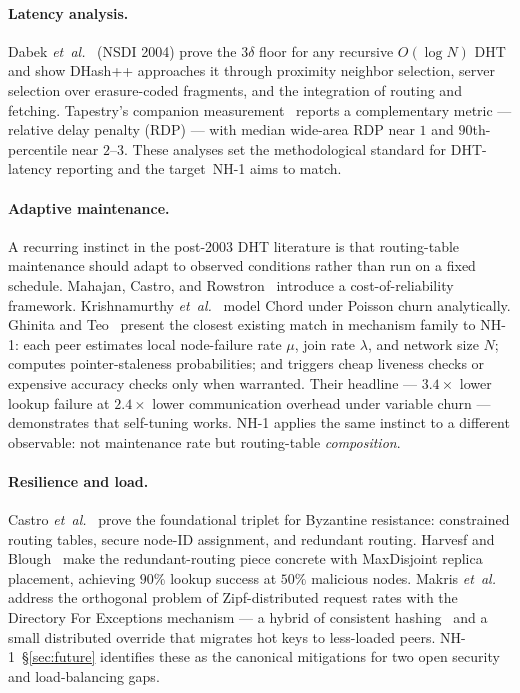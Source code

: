 \documentclass[conference]{IEEEtran}
\newcommand{\nhone}{NH-1\xspace}
\begin{document}
\paragraph{Latency analysis.}
Dabek \emph{et~al.}~\cite{dabek2004designing} (NSDI 2004) prove the $3\delta$
floor for any recursive $O(\log N)$ DHT and show DHash++ approaches it
through proximity neighbor selection, server selection over erasure-coded
fragments, and the integration of routing and fetching. Tapestry's
companion measurement~\cite{zhao2004tapestry} reports a complementary
metric --- relative delay penalty (RDP) --- with median wide-area RDP
near $1$ and $90$th-percentile near $2$--$3$. These analyses set the
methodological standard for DHT-latency reporting and the
target~\nhone aims to match.

\paragraph{Adaptive maintenance.}
A recurring instinct in the post-2003 DHT literature is that routing-table
maintenance should adapt to observed conditions rather than run on a
fixed schedule. Mahajan, Castro, and Rowstron~\cite{mahajan2003controlling}
introduce a cost-of-reliability framework. Krishnamurthy
\emph{et~al.}~\cite{krishnamurthy2005statistical} model Chord under Poisson
churn analytically. Ghinita and Teo~\cite{ghinita2006adaptive} present
the closest existing match in mechanism family to \nhone: each peer
estimates local node-failure rate $\mu$, join rate $\lambda$, and
network size $N$; computes pointer-staleness probabilities; and
triggers cheap liveness checks or expensive accuracy checks only when
warranted. Their headline --- $3.4\times$ lower lookup failure at
$2.4\times$ lower communication overhead under variable churn ---
demonstrates that self-tuning works. \nhone applies the same instinct
to a different observable: not maintenance rate but routing-table
\emph{composition}.

\paragraph{Resilience and load.}
Castro \emph{et~al.}~\cite{castro2002secure} prove the foundational triplet
for Byzantine resistance: constrained routing tables, secure node-ID
assignment, and redundant routing. Harvesf and
Blough~\cite{harvesf2007design} make the redundant-routing piece
concrete with MaxDisjoint replica placement, achieving $90\%$ lookup
success at $50\%$ malicious nodes. Makris
\emph{et~al.}~\cite{makris2017novel} address the orthogonal problem of
Zipf-distributed request rates with the Directory For Exceptions
mechanism --- a hybrid of consistent hashing~\cite{karger1997consistent}
and a small distributed
override that migrates hot keys to less-loaded peers. \nhone~\S\ref{sec:future}
identifies these as the canonical mitigations for two open security
and load-balancing gaps.
\end{document}
